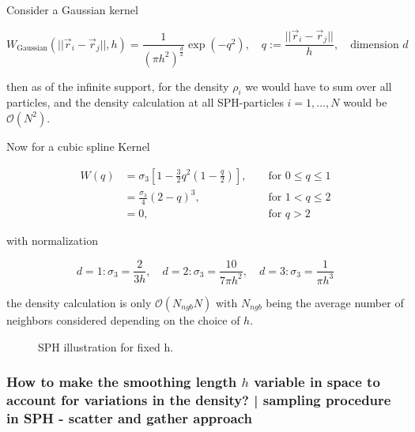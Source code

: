 Consider a Gaussian kernel

\begin{equation}
    W_{\text{Gaussian}}(||\vec{r}_i - \vec{r}_j||, h) = \frac{1}{(\pi h^2)^\frac{d}{2}} \exp{(-q^2)}, \quad q := \frac{||\vec{r}_i - \vec{r}_j||}{h}, \quad \text{dimension } d
\end{equation}

then as of the infinite support, for the density $\rho_i$ we would have to sum over all particles,
and the density calculation at all SPH-particles $i = 1,\dots,N$ would be $\mathcal{O}(N^2)$.

Now for a cubic spline Kernel

\begin{equation}
    \begin{aligned}
    W(q) & =\sigma_3\left[1-\frac{3}{2} q^2\left(1-\frac{q}{2}\right)\right], & & \text { for } 0 \leq q \leq 1 \\
    & =\frac{\sigma_3}{4}(2-q)^3, & & \text { for } 1<q \leq 2 \\
    & =0, & & \text { for } q>2
    \end{aligned}
\end{equation}

with normalization

\begin{equation}
    d=1: \sigma_3 = \frac{2}{3h}, \quad d=2: \sigma_3 = \frac{10}{7\pi h^2}, \quad d=3: \sigma_3 = \frac{1}{\pi h^3} 
\end{equation}

the density calculation is only $\mathcal{O}(N_{ngb}N)$ with $N_{ngb}$ being the average number of neighbors considered
depending on the choice of $h$.


\begin{figure}[!htb]
 \centering
 \hfill
 \caption{SPH illustration for fixed h.}
 \label{fig:sph}
\end{figure}

\subsubsection{How to make the smoothing length $h$ variable in space to account for variations in the density? | sampling procedure in SPH - scatter and gather approach}

